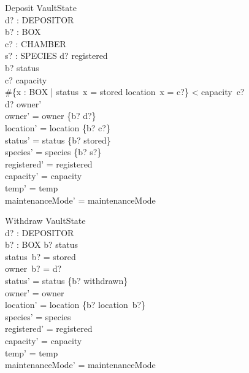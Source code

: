 \documentclass{article}
\begin{document}

\begin{schema}{Deposit}
\Delta VaultState\\
d? : DEPOSITOR\\
b? : BOX\\
c? : CHAMBER\\
s? : SPECIES
\where
d? \in registered\\
b? \notin \dom status\\
c? \in \dom capacity\\
\#\{x : BOX | status~x = stored \land location~x = c?\} < capacity~c?\\
d? \in \dom owner'\\
owner' = owner \cup \{b? \mapsto d?\}\\
location' = location \cup \{b? \mapsto c?\}\\
status' = status \cup \{b? \mapsto stored\}\\
species' = species \cup \{b? \mapsto s?\}\\
registered' = registered\\
capacity' = capacity\\
temp' = temp\\
maintenanceMode' = maintenanceMode
\end{schema}

\begin{schema}{Withdraw}
\Delta VaultState\\
d? : DEPOSITOR\\
b? : BOX
\where
b? \in \dom status\\
status~b? = stored\\
owner~b? = d?\\
status' = status \oplus \{b? \mapsto withdrawn\}\\
owner' = owner\\
location' = location \setminus \{b? \mapsto location~b?\}\\
species' = species\\
registered' = registered\\
capacity' = capacity\\
temp' = temp\\
maintenanceMode' = maintenanceMode
\end{schema}
\end{document}
